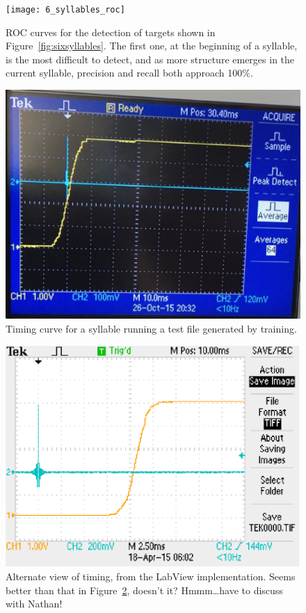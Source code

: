 \documentclass{article}
\newcommand\fig[1]{Figure~\ref{#1}}
\begin{document}
\begin{figure}
  \texttt{[image: 6\_syllables\_roc]}
  \caption{ROC curves for the detection of targets shown in Figure~\ref{fig:sixsyllables}. The first one, at the beginning of a syllable, is the most difficult to detect, and as more structure emerges in the current syllable, precision and recall both approach 100\%.}
  \label{fig:roc}
\end{figure}

\begin{figure}
  \includegraphics[width=\textwidth]{timing_nathan}
  \caption{Timing curve for a syllable running a test file generated by training.}
  \label{fig:timing_nathan}
\end{figure}

\begin{figure}
  \includegraphics[width=\textwidth]{detector-timing-2}
  \caption{Alternate view of timing, from the LabView implementation. Seems better than that in \fig{fig:timing_nathan}, doesn't it? Hmmm\dots have to discuss with Nathan!}
  \label{fig:timing_ben}
\end{figure}
\end{document}
